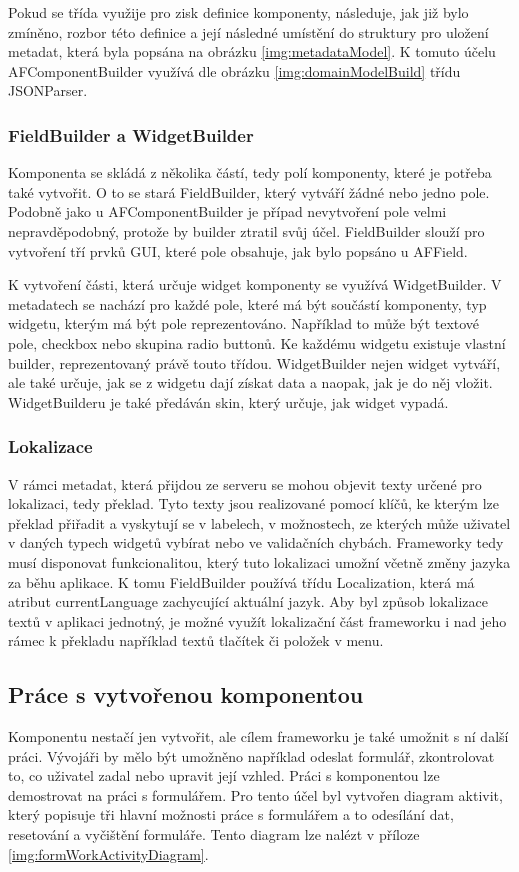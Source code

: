 Pokud se třída využije pro zisk definice komponenty, následuje, jak již bylo zmíněno, rozbor této definice a její následné umístění do struktury pro uložení metadat, která byla popsána na obrázku \ref{img:metadataModel}. K tomuto účelu AFComponentBuilder využívá dle obrázku \ref{img:domainModelBuild} třídu JSONParser. 

\subsubsection{FieldBuilder a WidgetBuilder}
Komponenta se skládá z několika částí, tedy polí komponenty, které je potřeba také vytvořit. O to se stará FieldBuilder, který vytváří žádné nebo jedno pole. Podobně jako u AFComponentBuilder je případ nevytvoření pole velmi nepravděpodobný, protože by builder ztratil svůj účel. FieldBuilder slouží pro vytvoření tří prvků GUI, které pole obsahuje, jak bylo popsáno u AFField. 

K vytvoření části, která určuje widget komponenty se využívá WidgetBuilder. V metadatech se nachází pro každé pole, které má být součástí komponenty, typ widgetu, kterým má být pole reprezentováno. Například to může být textové pole, checkbox nebo skupina radio buttonů. Ke každému widgetu existuje vlastní builder, reprezentovaný právě touto třídou. WidgetBuilder nejen widget vytváří, ale také určuje, jak se z widgetu dají získat data a naopak, jak je do něj vložit. WidgetBuilderu je také předáván skin, který určuje, jak widget vypadá.

\subsubsection{Lokalizace}
V rámci metadat, která přijdou ze serveru se mohou objevit texty určené pro lokalizaci, tedy překlad. Tyto texty jsou realizované pomocí klíčů, ke kterým lze překlad přiřadit a vyskytují se v labelech, v možnostech, ze kterých může uživatel v daných typech widgetů vybírat nebo ve validačních chybách. Frameworky tedy musí disponovat funkcionalitou, který tuto lokalizaci umožní včetně změny jazyka za běhu aplikace. K tomu FieldBuilder používá třídu Localization, která má atribut currentLanguage zachycující aktuální jazyk. Aby byl způsob lokalizace textů v aplikaci jednotný, je možné využít lokalizační část frameworku i nad jeho rámec k překladu například textů tlačítek či položek v menu. 

\subsection{Práce s vytvořenou komponentou}
Komponentu nestačí jen vytvořit, ale cílem frameworku je také umožnit s ní další práci. Vývojáři by mělo být umožněno například odeslat formulář, zkontrolovat to, co uživatel zadal nebo upravit její vzhled. Práci s komponentou lze demostrovat na práci s formulářem. Pro tento účel byl vytvořen diagram aktivit, který popisuje tři hlavní možnosti práce s formulářem a to odesílání dat, resetování a vyčištění formuláře. Tento diagram lze nalézt v příloze \ref{img:formWorkActivityDiagram}.

